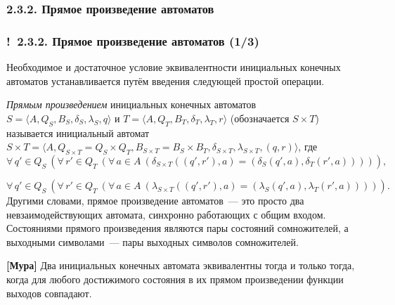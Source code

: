 \documentclass[mathserif,12pt,aspectratio=169]{beamer}
\renewcommand{\index}[1]{}
\def\NB#1{{\bf\color{brown}#1}}
\def\odmkey#1#2{{\it\color{red} #1}\index{#2}}
\def\A#1#2{\forall\,#1\ \left(#2\right)}
\def\Ok{{\color{green}\textbf{!}\ }}
\begin{document}
\subsubsection{2.3.2. Прямое произведение автоматов}\label{2.3.2.}
\begin{frame}
\frametitle{\Ok  2.3.2. Прямое произведение автоматов (1/3)}

Необходимое и достаточное условие эквивалентности инициальных
конечных автоматов устанавливается путём введения следующей
простой операции.

\odmkey{Прямым произведением}{Произведение!автоматов!прямое}
инициальных конечных автоматов $S=\langle A, Q_S, B_S, \delta_S,
\lambda_S, q\rangle$ и $T=\langle A, Q_{T}, B_{T}, \delta_{T},
\lambda_{T}, r\rangle$ (обозначается $S\times T$) называется
инициальный автомат \\$S\times {T} = \langle A,
Q_{S\times{T}}=Q_S\times{Q}_{T}, B_{S\times {T}}= B_S\times B_{T},
\delta_{S\times{T}}, \lambda_{S\times{T}}, (q,r)\rangle$, где
$$
\A{q'\in Q_S}{\A{r'\in Q_{T}}{\A{a\in A}{
\delta_{S\times{T}}\left((q',r'),a\right)=\left(\delta_S(q',a),
\delta_{T}(r',a)\right)}}},
$$

\vspace{-12pt}
$$
\A{q'\in Q_S}{\A{r'\in Q_{T}}{\A{a\in A}{
\lambda_{S\times{T}}\left((q',r'),a\right)=\left(\lambda_S(q',a),
\lambda_{T}(r',a)\right)}}}.
$$
Другими словами, прямое произведение автоматов~--- это просто два
невзаимодействующих автомата, синхронно работающих с общим
входом. Состояниями прямого произведения являются пары состояний
сомножителей, а выходными символами~---
пары выходных символов сомножителей.

\begin{theorem} {\NB{[Мура]}}
Два инициальных конечных автомата эквивалентны тогда и только
тогда, когда для любого достижимого состояния в их прямом
произведении функции выходов совпадают.
\end{theorem}
\end{frame}
\end{document}
